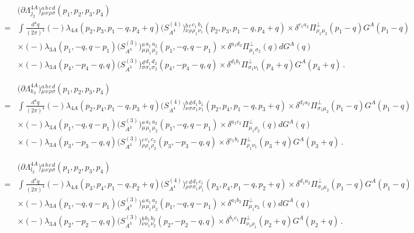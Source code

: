 \begin{align}
  &\big(\partial\Lambda^{4A}_{j_2}\big){}^{a}_{\mu}{}^{b}_{\nu}{}^{c}_{\rho}{}^{d}_{\sigma}(p_1,p_2,p_3,p_4)\nonumber \\[2ex]
 =&\int \frac{d^4 q}{(2\pi)^4} (-)\lambda_{4A}(p_2,p_3,p_1-q,p_4+q)\big(S^{(4)}_{A^4}\big){}^{b}_{\nu}{}^{c}_{\rho}{}^{c_1}_{\rho_1}{}^{b_1}_{\nu_1}(p_2,p_3,p_1-q,p_4+q)\times\delta^{c_1a_2}\Pi_{\rho_1\mu_2}^{\perp}(p_1-q)G^A(p_1-q)\nonumber \\[2ex]
 &\times(-)\lambda_{3A}(p_1,-q,q-p_1)\big(S^{(3)}_{A^3}\big){}^{a}_{\mu}{}^{a_1}_{\mu_1}{}^{a_2}_{\mu_2}(p_1,-q,q-p_1)\times\delta^{a_1d_2}\Pi_{\mu_1\sigma_2}^{\perp}(q)dG^A(q)\nonumber \\[2ex]
 &\times(-)\lambda_{3A}(p_4,-p_4-q,q)\big(S^{(3)}_{A^3}\big){}^{d}_{\sigma}{}^{d_1}_{\sigma_1}{}^{d_2}_{\sigma_2}(p_4,-p_4-q,q)\times\delta^{d_1b_1}\Pi_{\sigma_1\nu_1}^{\perp}(p_4+q)G^A(p_4+q)\,.
\end{align}

\begin{align}
  &\big(\partial\Lambda^{4A}_{k_2}\big){}^{a}_{\mu}{}^{b}_{\nu}{}^{c}_{\rho}{}^{d}_{\sigma}(p_1,p_2,p_3,p_4)\nonumber \\[2ex]
 =&\int \frac{d^4 q}{(2\pi)^4} (-)\lambda_{4A}(p_2,p_4,p_1-q,p_3+q)\big(S^{(4)}_{A^4}\big){}^{b}_{\nu}{}^{d}_{\sigma}{}^{d_1}_{\sigma_1}{}^{b_1}_{\nu_1}(p_2,p_4,p_1-q,p_3+q)\times\delta^{d_1a_2}\Pi_{\sigma_1\mu_2}^{\perp}(p_1-q)G^A(p_1-q)\nonumber \\[2ex]
 &\times(-)\lambda_{3A}(p_1,-q,q-p_1)\big(S^{(3)}_{A^3}\big){}^{a}_{\mu}{}^{a_1}_{\mu_1}{}^{a_2}_{\mu_2}(p_1,-q,q-p_1)\times\delta^{a_1c_2}\Pi_{\mu_1\rho_2}^{\perp}(q)dG^A(q)\nonumber \\[2ex]
 &\times(-)\lambda_{3A}(p_3,-p_3-q,q)\big(S^{(3)}_{A^3}\big){}^{c}_{\rho}{}^{c_1}_{\rho_1}{}^{c_2}_{\rho_2}(p_3,-p_3-q,q)\times\delta^{c_1b_1}\Pi_{\rho_1\nu_1}^{\perp}(p_3+q)G^A(p_3+q)\,.
\end{align}

\begin{align}
  &\big(\partial\Lambda^{4A}_{l_2}\big){}^{a}_{\mu}{}^{b}_{\nu}{}^{c}_{\rho}{}^{d}_{\sigma}(p_1,p_2,p_3,p_4)\nonumber \\[2ex]
 =&\int \frac{d^4 q}{(2\pi)^4} (-)\lambda_{4A}(p_3,p_4,p_1-q,p_2+q)\big(S^{(4)}_{A^4}\big){}^{c}_{\rho}{}^{d}_{\sigma}{}^{d_1}_{\sigma_1}{}^{c_1}_{\rho_1}(p_3,p_4,p_1-q,p_2+q)\times\delta^{d_1a_2}\Pi_{\sigma_1\mu_2}^{\perp}(p_1-q)G^A(p_1-q)\nonumber \\[2ex]
 &\times(-)\lambda_{3A}(p_1,-q,q-p_1)\big(S^{(3)}_{A^3}\big){}^{a}_{\mu}{}^{a_1}_{\mu_1}{}^{a_2}_{\mu_2}(p_1,-q,q-p_1)\times\delta^{a_1b_2}\Pi_{\mu_1\nu_2}^{\perp}(q)dG^A(q)\nonumber \\[2ex]
 &\times(-)\lambda_{3A}(p_2,-p_2-q,q)\big(S^{(3)}_{A^3}\big){}^{b}_{\nu}{}^{b_1}_{\nu_1}{}^{b_2}_{\nu_2}(p_2,-p_2-q,q)\times\delta^{b_1c_1}\Pi_{\nu_1\rho_1}^{\perp}(p_2+q)G^A(p_2+q)\,.
\end{align}

%
